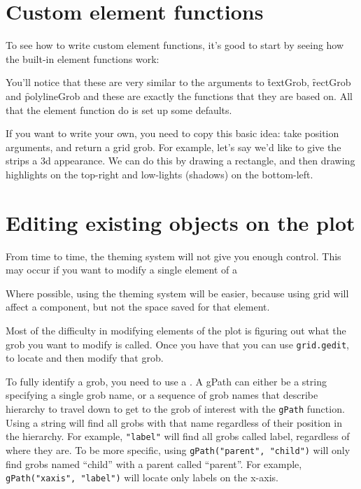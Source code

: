 \section{Custom element functions}
\label{sec:custom-elements}

To see how to write custom element functions, it's good to start by seeing how the built-in element functions work:

% 


You'll notice that these are very similar to the arguments to \f{textGrob}, \f{rectGrob} and \f{polylineGrob} and these are exactly the functions that they are based on.  All that the element function do is set up some defaults.  

If you want to write your own, you need to copy this basic idea: take position arguments, and return a grid grob.  For example, let's say we'd like to give the strips a 3d appearance.  We can do this by drawing a rectangle, and then drawing highlights on the top-right and low-lights (shadows) on the bottom-left.


\section{Editing existing objects on the plot}
\label{sec:grid-existing}

From time to time, the theming system will not give you enough control.  This may occur if you want to modify a single element of a 

Where possible, using the theming system will be easier, because using grid will affect a component, but not the space saved for that element.

Most of the difficulty in modifying elements of the plot is figuring out what the grob you want to modify is called.  Once you have that you can use {\tt grid.gedit}, to locate and then modify that grob. 

To fully identify a grob, you need to use a .  A gPath can either be a string specifying a single grob name, or a sequence of grob names that describe hierarchy to travel down to get to the grob of interest with the {\tt gPath} function.  Using a string will find all grobs with that name regardless of their position in the hierarchy.  For example, {\tt "label"} will find all grobs called label, regardless of where they are.  To be more specific, using {\tt gPath("parent", "child")} will only find grobs named ``child'' with a parent called ``parent''.  For example, {\tt gPath("xaxis", "label")} will locate only labels on the x-axis.

